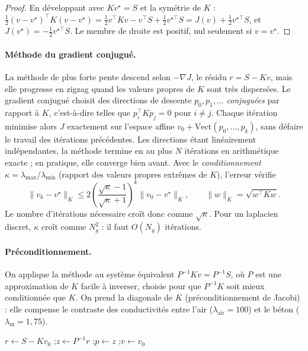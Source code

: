 \documentclass[11pt,a4paper]{article}
\theoremstyle{definition}
\theoremstyle{remark}
\newcommand{\la}{\lambda_{\mathrm{air}}}
\newcommand{\lm}{\lambda_{\mathrm{m}}}
\begin{document}
\begin{proof}
En développant avec $Kv^\star = S$ et la symétrie de $K$ :
$\frac12(v-v^\star)^{\top}K(v-v^\star) = \frac12 v^{\top}Kv - v^{\top}S + \frac12
v^{\star\top}S = J(v) + \frac12 v^{\star\top}S$, et $J(v^\star) = -\frac12
v^{\star\top}S$. Le membre de droite est positif, nul seulement si $v = v^\star$.
\end{proof}

\paragraph{Méthode du gradient conjugué.} La méthode de plus forte pente descend
selon $-\nabla J$, le résidu $r = S - Kv$, mais elle progresse en zigzag quand les
valeurs propres de $K$ sont très dispersées. Le gradient conjugué \cite{hestenes1952}
choisit des directions de descente $p_0, p_1, \dots$ \emph{conjuguées} par rapport à
$K$, c'est-à-dire telles que $p_i^{\top}Kp_j = 0$ pour $i\ne j$. Chaque itération
minimise alors $J$ exactement sur l'espace affine $v_0 + \mathrm{Vect}(p_0,\dots,p_k)$,
sans défaire le travail des itérations précédentes. Les directions étant linéairement
indépendantes, la méthode termine en au plus $N$ itérations en arithmétique exacte ;
en pratique, elle converge bien avant. Avec le \emph{conditionnement}
$\kappa = \lambda_{\max}/\lambda_{\min}$ (rapport des valeurs propres extrêmes de
$K$), l'erreur vérifie \cite{saad2003}
\[
\|v_k - v^\star\|_K \le 2\left(\frac{\sqrt\kappa - 1}{\sqrt\kappa + 1}\right)^{k}
\|v_0 - v^\star\|_K,\qquad \|w\|_K = \sqrt{w^{\top}Kw}.
\]
Le nombre d'itérations nécessaire croît donc comme $\sqrt\kappa$. Pour un laplacien
discret, $\kappa$ croît comme $N_g^2$ : il faut $O(N_g)$ itérations.

\paragraph{Préconditionnement.} On applique la méthode au système équivalent
$P^{-1}Kv = P^{-1}S$, où $P$ est une approximation de $K$ facile à inverser,
choisie pour que $P^{-1}K$ soit mieux conditionnée que $K$. On prend la diagonale de $K$
(préconditionnement de Jacobi) : elle compense le contraste des conductivités entre
l'air ($\la = 100$) et le béton ($\lm = 1,75$).

\begin{algorithm}[H]
\caption{Gradient conjugué préconditionné}
$r \leftarrow S - Kv_0$ ;\quad $z \leftarrow P^{-1}r$ ;\quad $p \leftarrow z$ ;\quad $v \leftarrow v_0$\;
\end{algorithm}
\end{document}
